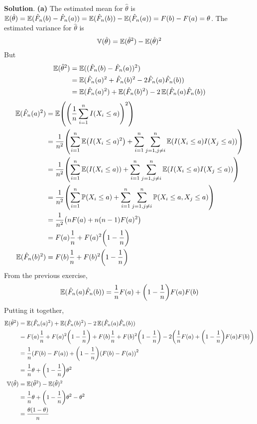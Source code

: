 \textbf{Solution}.
\textbf{(a)}
The estimated mean for \(\hat{\theta}\) is
\(\operatorname{\mathbb{E}}(\hat{\theta}) = \operatorname{\mathbb{E}}(\hat{F}_{n}(b) - \hat{F}_{n}(a)) = \operatorname{\mathbb{E}}(\hat{F}_{n}(b)) - \operatorname{\mathbb{E}}(\hat{F}_{n}(a)) = F(b) - F(a) = \theta\).
The estimated variance for \(\hat{\theta}\) is
\[
\operatorname{\mathbb{V}}(\hat{\theta}) = \operatorname{\mathbb{E}}(\hat{\theta}^{2}) - \operatorname{\mathbb{E}}(\hat{\theta})^{2}
\]
But
\begin{align*}
\operatorname{\mathbb{E}}(\hat{\theta}^{2}) & = \operatorname{\mathbb{E}}((\hat{F}_{n}(b) - \hat{F}_{n}(a))^{2})  \\
&= \operatorname{\mathbb{E}}(\hat{F}_{n}(a)^{2} + \hat{F}_{n}(b)^{2} - 2 \hat{F}_{n}(a)\hat{F}_{n}(b)) \\
&= \operatorname{\mathbb{E}}(\hat{F}_{n}(a)^{2}) + \operatorname{\mathbb{E}}(\hat{F}_{n}(b)^{2}) - 2 \operatorname{\mathbb{E}}(\hat{F}_{n}(a)\hat{F}_{n}(b))
\end{align*}
\begin{align*}
\EXP(\hat{F}_{n}(a)^{2}) & = \EXP\left(\left(\frac{1}{n} \sum_{i=1}^{n} I(X_{i} \leq a)\right)^{2}\right) \\
& = \frac{1}{n^{2}} \left(\sum_{i=1}^{n} \EXP \left( I(X_{i} \leq a)^{2} \right) + \sum_{i=1}^{n} \sum_{j=1, j \neq i}^{n} \EXP\left( I(X_{i} \leq a) I(X_{j} \leq a) \right) \right) \\
& = \frac{1}{n^{2}} \left(\sum_{i=1}^{n} \EXP \left( I(X_{i} \leq a) \right) + \sum_{i=1}^{n} \sum_{j=1, j \neq i}^{n} \EXP\left( I(X_{i} \leq a) I(X_{j} \leq a) \right) \right) \\
& = \frac{1}{n^{2}} \left(\sum_{i=1}^{n} \PROB \left( X_{i} \leq a \right) + \sum_{i=1}^{n} \sum_{j=1, j \neq i}^{n} \PROB\left( X_{i} \leq a, X_{j} \leq a \right) \right) \\
& = \frac{1}{n^{2}} \left(n F(a) + n(n-1) F(a)^{2} \right) \\
&= F(a) \frac{1}{n} + F(a)^{2} \left(1 - \frac{1}{n} \right) \\
\EXP(\hat{F}_{n}(b)^{2}) & = F(b) \frac{1}{n} + F(b)^{2} \left(1 - \frac{1}{n} \right)
\end{align*}
From the previous exercise,
\[
\EXP(\hat{F}_{n}(a)\hat{F}_{n}(b)) = \frac{1}{n} F(a) + \left( 1 - \frac{1}{n}\right) F(a)F(b)
\]
Putting it together,
\begin{align*}
\EXP(\hat{\theta}^{2}) 
&= \EXP(\hat{F}_{n}(a)^{2}) + \EXP(\hat{F}_{n}(b)^{2}) - 2 \EXP(\hat{F}_{n}(a)\hat{F}_{n}(b)) \\
&=   F(a) \frac{1}{n} + F(a)^{2} \left(1 - \frac{1}{n} \right) +  F(b) \frac{1}{n} + F(b)^{2} \left(1 - \frac{1}{n} \right) - 2 \left( \frac{1}{n} F(a) + \left( 1 - \frac{1}{n}\right) F(a)F(b) \right) \\
&=  \frac{1}{n} \left(F(b) - F(a)\right) + \left( 1 - \frac{1}{n}\right) \left( F(b) - F(a) \right)^{2} \\
&=  \frac{1}{n} \theta + \left( 1 - \frac{1}{n} \right) \theta^{2} \\
\VAR(\hat{\theta}) &=  \EXP(\hat{\theta}^{2}) - \EXP(\hat{\theta})^{2} \\
&=  \frac{1}{n} \theta + \left( 1 - \frac{1}{n} \right) \theta^{2} - \theta^{2} \\
&= \frac{\theta (1 - \theta)}{n} 
\end{align*}
